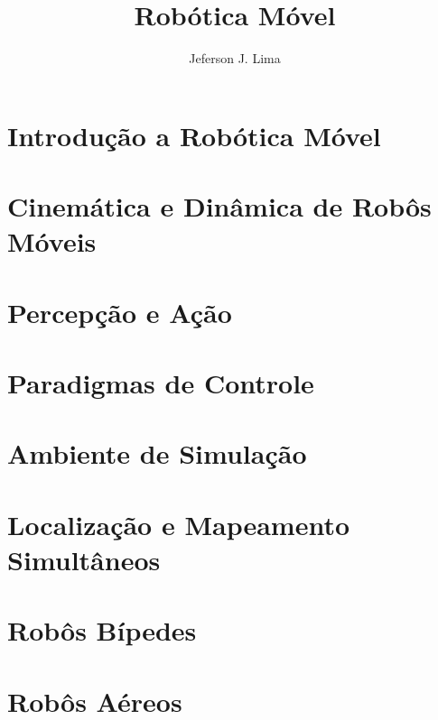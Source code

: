 \documentclass[krantz1,ChapterTOCs]{krantz}
\begin{document}
\frontmatter

\title{Robótica Móvel 
}
\author{Jeferson J. Lima}

\maketitle

%
\setcounter{page}{7} %
\tableofcontents
%
%
\listoffigures
\listoftables
%
%

\mainmatter


\part{Introdução a Robótica Móvel}


\part{Cinemática e Dinâmica de Robôs Móveis}

\part{Percepção e Ação}

\part{Paradigmas de Controle}

\part{Ambiente de Simulação}

\part{Localização e Mapeamento Simultâneos}

\part{Robôs Bípedes}

\part{Robôs Aéreos}




\printindex
\end{document}
